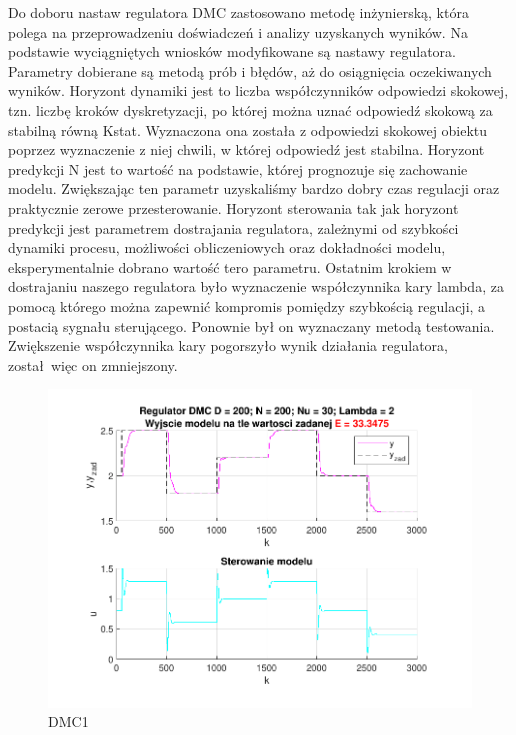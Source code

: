 Do doboru nastaw regulatora DMC zastosowano metodę inżynierską, 
która polega na przeprowadzeniu doświadczeń i analizy uzyskanych wyników. 
Na podstawie wyciągniętych wniosków modyfikowane są nastawy regulatora. 
Parametry  dobierane są metodą prób i błędów, aż do osiągnięcia oczekiwanych wyników.
Horyzont dynamiki jest to liczba współczynników odpowiedzi skokowej, 
tzn. liczbę kroków dyskretyzacji, po której można uznać odpowiedź skokową za stabilną równą Kstat. 
Wyznaczona ona została z odpowiedzi skokowej obiektu poprzez wyznaczenie z niej chwili, 
w której odpowiedź jest stabilna. Horyzont predykcji N jest to wartość na podstawie, 
której prognozuje się zachowanie modelu. 
Zwiększając ten parametr uzyskaliśmy bardzo dobry czas regulacji oraz praktycznie zerowe przesterowanie. 
Horyzont sterowania tak jak horyzont predykcji jest parametrem dostrajania regulatora, 
zależnymi od szybkości dynamiki procesu, możliwości obliczeniowych oraz dokładności modelu, 
eksperymentalnie dobrano wartość tero parametru. 
Ostatnim krokiem w dostrajaniu naszego regulatora było wyznaczenie współczynnika kary lambda, 
za pomocą którego można zapewnić kompromis pomiędzy szybkością regulacji, a postacią sygnału sterującego. 
Ponownie był on wyznaczany metodą testowania. 
Zwiększenie współczynnika kary pogorszyło wynik działania regulatora, został więc on zmniejszony.


\begin{figure}[H]
    \centering
    \includegraphics[scale=0.90]{../projekt/zad4_5/DMC_pdf/DMC_1.pdf}
    \caption{DMC1}
\end{figure}

